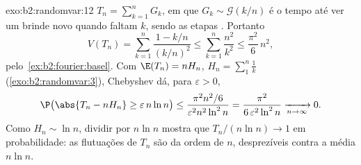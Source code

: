 \begin{solution}{exo:b2:randomvar:12}
$T_n = \sum_{k=1}^nG_k$, em que $G_k \sim \mathcal G(k/n)$ é
o tempo até ver um brinde novo quando faltam $k$, sendo as etapas
. Portanto
\[
V(T_n) = \sum_{k=1}^n\frac{1 - k/n}{(k/n)^2}
\leq \sum_{k=1}^n\frac{n^2}{k^2}
\leq \frac{\pi^2}6\,n^2 ,
\]
pelo~\cref{ex:b2:fourier:basel}. Com $\E(T_n) = nH_n$, $H_n =
\sum_1^n\frac1k$ (\cref{exo:b2:randomvar:3}), Chebyshev dá,
para $\varepsilon > 0$,
\[
\P\bigl(\abs{T_n - nH_n} \geq \varepsilon\,n\ln n\bigr)
\leq \frac{\pi^2n^2/6}{\varepsilon^2n^2\ln^2 n}
= \frac{\pi^2}{6\,\varepsilon^2\ln^2n}
\xrightarrow[n\to\infty]{} 0 .
\]
Como $H_n \sim \ln n$, dividir por $n\ln n$ mostra que
$T_n/(n\ln n) \to 1$ em probabilidade: as flutuações de
$T_n$ são da ordem de $n$, desprezíveis contra a média $n\ln n$.
\end{solution}

